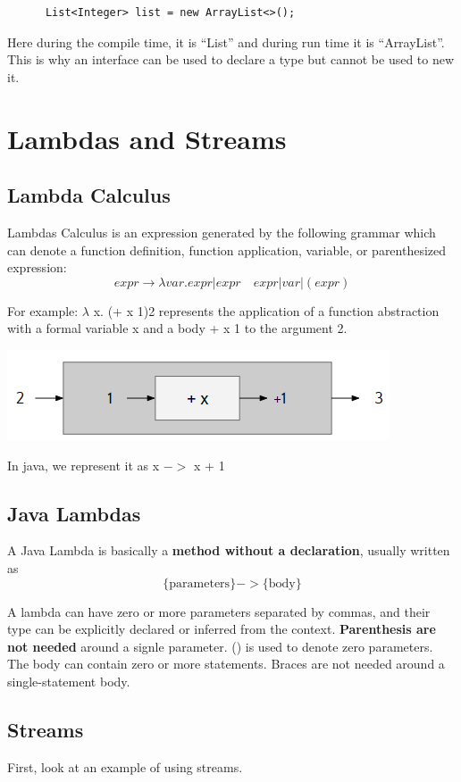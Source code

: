 \documentclass[letterpaper,12pt]{article}
\begin{document}
\begin{lstlisting}
      List<Integer> list = new ArrayList<>();
\end{lstlisting}
Here during the compile time, it is ``List'' and during run time it is ``ArrayList''. This is why an interface can be used to declare a type but cannot be used to new it.

\section{Lambdas and Streams}

\subsection{Lambda Calculus}

Lambdas Calculus is an expression generated by the following grammar which can
denote a function definition, function application, variable, or parenthesized
expression:
\[
      expr \to \lambda var. expr|expr\quad expr|var|(expr)
\]

For example: $\lambda$ x. (+ x 1)2 represents the application of a function
abstraction with a formal variable x and a body + x 1 to the argument 2.

\includegraphics*{./summary_image/Lambda Calculus Example.png}

In java, we represent it as x $->$ x + 1

\subsection{Java Lambdas}
A Java Lambda is basically a \textbf{method without a declaration}, usually
written as
\[
      \text{\{parameters\}}->\text{\{body\}}
\]

A lambda can have zero or more parameters separated by commas, and their type
can be explicitly declared or inferred from the context.
\textbf{Parenthesis are not needed} around a signle parameter. () is used to
denote zero parameters. The body can contain zero or more statements. Braces
are not needed around a single-statement body.

\subsection{Streams}
First, look at an example of using streams.
\end{document}
